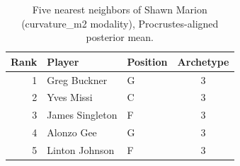 \begin{table}[htbp]
  \centering\small
  \begin{tabular}{rllc}
    \toprule
    Rank & Player & Position & Archetype \\
    \midrule
    1 & Greg Buckner & G & 3 \\
    2 & Yves Missi & C & 3 \\
    3 & James Singleton & F & 3 \\
    4 & Alonzo Gee & G & 3 \\
    5 & Linton Johnson & F & 3 \\
    \bottomrule
  \end{tabular}
  \caption{Five nearest neighbors of Shawn Marion (curvature_m2 modality), Procrustes-aligned posterior mean.}
  \label{tab:Shawn_Marion_neighbors_curvature_m2}
\end{table}

